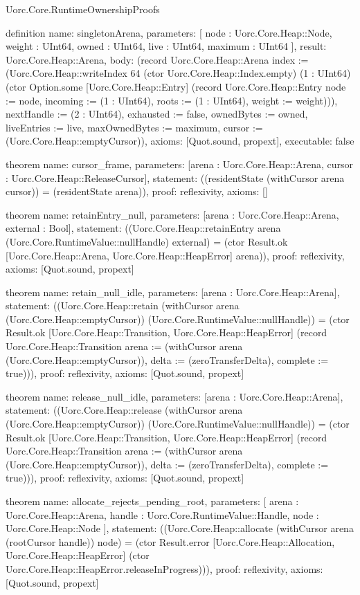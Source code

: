 \begin{lexlean}{Uorc.Core.RuntimeOwnershipProofs}
\begin{semanticmodule}
definition{
  name: singletonArena,
  parameters: [
    node : Uorc.Core.Heap::Node,
    weight : UInt64,
    owned : UInt64,
    live : UInt64,
    maximum : UInt64
  ],
  result: Uorc.Core.Heap::Arena,
  body: (record Uorc.Core.Heap::Arena {index := (Uorc.Core.Heap::writeIndex 64 (ctor Uorc.Core.Heap::Index.empty) (1 : UInt64) (ctor Option.some [Uorc.Core.Heap::Entry] (record Uorc.Core.Heap::Entry {node := node, incoming := (1 : UInt64), roots := (1 : UInt64), weight := weight}))), nextHandle := (2 : UInt64), exhausted := false, ownedBytes := owned, liveEntries := live, maxOwnedBytes := maximum, cursor := (Uorc.Core.Heap::emptyCursor)}),
  axioms: [Quot.sound, propext],
  executable: false
}

theorem{
  name: cursor_frame,
  parameters: [arena : Uorc.Core.Heap::Arena, cursor : Uorc.Core.Heap::ReleaseCursor],
  statement: ((residentState (withCursor arena cursor)) = (residentState arena)),
  proof: reflexivity{},
  axioms: []
}

theorem{
  name: retainEntry_null,
  parameters: [arena : Uorc.Core.Heap::Arena, external : Bool],
  statement: ((Uorc.Core.Heap::retainEntry arena (Uorc.Core.RuntimeValue::nullHandle) external) = (ctor Result.ok [Uorc.Core.Heap::Arena, Uorc.Core.Heap::HeapError] arena)),
  proof: reflexivity{},
  axioms: [Quot.sound, propext]
}

theorem{
  name: retain_null_idle,
  parameters: [arena : Uorc.Core.Heap::Arena],
  statement: ((Uorc.Core.Heap::retain (withCursor arena (Uorc.Core.Heap::emptyCursor)) (Uorc.Core.RuntimeValue::nullHandle)) = (ctor Result.ok [Uorc.Core.Heap::Transition, Uorc.Core.Heap::HeapError] (record Uorc.Core.Heap::Transition {arena := (withCursor arena (Uorc.Core.Heap::emptyCursor)), delta := (zeroTransferDelta), complete := true}))),
  proof: reflexivity{},
  axioms: [Quot.sound, propext]
}

theorem{
  name: release_null_idle,
  parameters: [arena : Uorc.Core.Heap::Arena],
  statement: ((Uorc.Core.Heap::release (withCursor arena (Uorc.Core.Heap::emptyCursor)) (Uorc.Core.RuntimeValue::nullHandle)) = (ctor Result.ok [Uorc.Core.Heap::Transition, Uorc.Core.Heap::HeapError] (record Uorc.Core.Heap::Transition {arena := (withCursor arena (Uorc.Core.Heap::emptyCursor)), delta := (zeroTransferDelta), complete := true}))),
  proof: reflexivity{},
  axioms: [Quot.sound, propext]
}

theorem{
  name: allocate_rejects_pending_root,
  parameters: [
    arena : Uorc.Core.Heap::Arena,
    handle : Uorc.Core.RuntimeValue::Handle,
    node : Uorc.Core.Heap::Node
  ],
  statement: ((Uorc.Core.Heap::allocate (withCursor arena (rootCursor handle)) node) = (ctor Result.error [Uorc.Core.Heap::Allocation, Uorc.Core.Heap::HeapError] (ctor Uorc.Core.Heap::HeapError.releaseInProgress))),
  proof: reflexivity{},
  axioms: [Quot.sound, propext]
}


\end{semanticmodule}
\end{lexlean}
